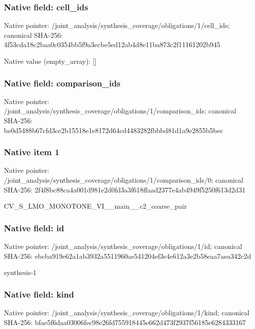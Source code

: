 \documentclass[10pt,a4paper]{article}
\begin{document}
\subsubsection{Native field: cell\_\allowbreak{}ids}
Native pointer: /joint\_\allowbreak{}analysis/synthesis\_\allowbreak{}coverage/obligations/1/cell\_\allowbreak{}ids; canonical SHA-256: 4f53cda18c2baa0c0354bb5f9a3ecbe5ed12ab4d8e11ba873c2f11161202b945

Native value (empty\_\allowbreak{}array): []

\subsubsection{Native field: comparison\_\allowbreak{}ids}
Native pointer: /joint\_\allowbreak{}analysis/synthesis\_\allowbreak{}coverage/obligations/1/comparison\_\allowbreak{}ids; canonical SHA-256: be0d5488b67cfd3ce2b15518e1e8172d64cd4483282fbbbd81d1a9e2855b5bec

\subsubsection{Native item 1}
Native pointer: /joint\_\allowbreak{}analysis/synthesis\_\allowbreak{}coverage/obligations/1/comparison\_\allowbreak{}ids/0; canonical SHA-256: 2f4f8bc88ca4a001d981e2d0fd3a3f618ffaad2377e4ab4949f5250f613d2d31

\begingroup\raggedright\sloppy CV\_\allowbreak{}S\_\allowbreak{}LMO\_\allowbreak{}MONOTONE\_\allowbreak{}VI\_\allowbreak{}\_\allowbreak{}main\_\allowbreak{}\_\allowbreak{}c2\_\allowbreak{}coarse\_\allowbreak{}pair\par\endgroup

\subsubsection{Native field: id}
Native pointer: /joint\_\allowbreak{}analysis/synthesis\_\allowbreak{}coverage/obligations/1/id; canonical SHA-256: ebcba919e62a1ab3932a5511960ae541204ef3e4e612a3e2b58eaa7aea342c2d

\begingroup\raggedright\sloppy synthesis-1\par\endgroup

\subsubsection{Native field: kind}
Native pointer: /joint\_\allowbreak{}analysis/synthesis\_\allowbreak{}coverage/obligations/1/kind; canonical SHA-256: bfae5f6daa03006fec98e26fd755918445e662d473f2937f56185e6284333167
\end{document}

